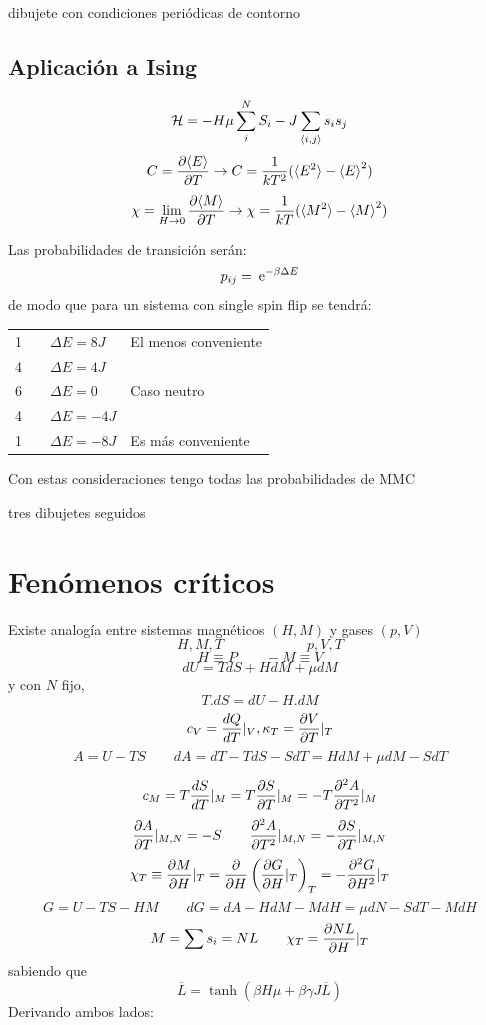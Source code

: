 \documentclass[10pt,oneside]{CBFT_book}
\begin{document}
dibujete con condiciones periódicas de contorno

\subsection{Aplicación a Ising}

\[
	\mathcal{H} = -H \mu \sum_i^N S_i - J \sum_{\braket{i,j}} s_i s_j
\]
\[
	C = \dpar{\braket{E}}{T} \rightarrow C = \frac{1}{kT^ 2}(\braket{E^2}-\braket{E}^2)
\]
\[
	\chi = \lim_{H\to 0} \dpar{\braket{M}}{T} \rightarrow \chi = \frac{1}{kT}(\braket{M^2}-\braket{M}^2)
\]

Las probabilidades de transición serán:
\[
	p_{ij} = \euler^{-\beta \Delta E }
\]
de modo que para un sistema con single spin flip se tendrá:
\begin{center}
\begin{tabular}{llll}
1 &  & $ \Delta E = 8J $  & El menos conveniente \\
4 &  & $ \Delta E = 4J $ &  \\
6 &  & $ \Delta E = 0 $ & Caso neutro \\
4 &  & $ \Delta E = -4J $ &  \\
1 &  & $ \Delta E = -8J $ & Es más conveniente
\end{tabular}
\end{center}


Con estas consideraciones tengo todas las probabilidades de MMC

tres dibujetes seguidos

\section{Fenómenos críticos}

Existe analogía entre sistemas magnéticos $(H,M)$ y gases $(p,V)$
\[
	H,M,T	\qquad \qquad \qquad p,V,T
\]
\[
	H \equiv P \qquad -M \equiv V
\]
\[
	dU = TdS + HdM + \mu dM 
\]
y con $N$ fijo,
\[
	T.dS = dU - H.dM	
\]
\[
	c_V = \dtot{Q}{T}|_V, \kappa_T = \dpar{V}{T}|_T
\]
\[
	A = U - TS \qquad dA = dT - TdS - SdT = HdM + \mu dM - SdT
\]

\[
	c_M = T\dtot{S}{T}|_M = T \dpar{S}{T}|_M = -T\dpar[2]{A}{T}|_M 
\]
\[
	\dpar{A}{T}|_{M,N} = -S \qquad \dpar[2]{A}{T}|_{M,N} = -\dpar{S}{T}|_{M,N}
\]
\[
	\chi_T \equiv \dpar{M}{H}|_T = \dpar{}{H}\left(\dpar{G}{H}|_T\right)_T = - \dpar[2]{G}{H}|_T
\]
\[
	G = U - TS -HM \qquad dG = dA - HdM - MdH = \mu dN - SdT - M dH
\]
\[
	M = \sum s_i = NL \qquad \chi_T = \dpar{NL}{H}|_T
\]
sabiendo que 
\[
	\overline{L} = \tanh ( \beta H \mu + \beta \gamma J \overline{L} )
\]
Derivando ambos lados:
\end{document}
